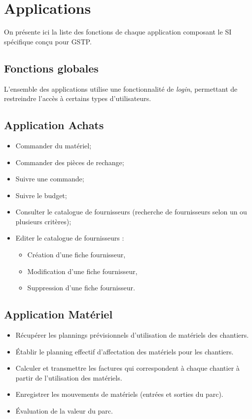 \section{Applications}

On présente ici la liste des fonctions de chaque application composant le
SI spécifique conçu pour GSTP.


\subsection{Fonctions globales}

L'ensemble des applications utilise une fonctionnalité de {\sl login}, permettant
de restreindre l'accès à certains types d'utilisateurs.


\subsection{Application Achats}

\begin{itemize}
\item Commander du matériel;
\item Commander des pièces de rechange;
\item Suivre une commande;
\item Suivre le budget;
\item Consulter le catalogue de fournisseurs (recherche de fournisseurs selon 
un ou plusieurs critères);
\item Editer le catalogue de fournisseurs :
	\begin{itemize}
	\item Création d'une fiche fournisseur,
	\item Modification d'une fiche fournisseur,
	\item Suppression d'une fiche fournisseur.
	\end{itemize}
\end{itemize}

\subsection{Application Matériel}
\begin{itemize}
\item Récupérer les plannings prévisionnels d'utilisation de matériels
des chantiers.
\item Établir le planning effectif d'affectation des
matériels pour les chantiers.
\item Calculer et transmettre les factures qui correspondent à chaque chantier
à partir de l'utilisation des matériels.
\item Enregistrer les mouvements de matériels (entrées et sorties du parc).
\item Évaluation de la valeur du parc.
\end{itemize}


